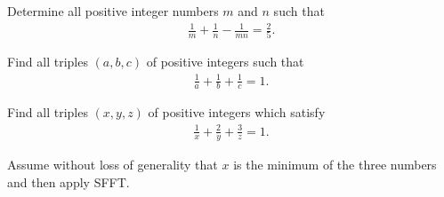 \documentclass{subfile}
\begin{document}

	\begin{problem} %
		Determine all positive integer numbers $m$ and $n$ such that
			\begin{align*}
				\frac{1}{m}+\frac{1}{n}-\frac{1}{mn}=\frac{2}{5}.
			\end{align*}
	\end{problem}

	\begin{problem} %
		Find all triples $(a,b,c)$ of positive integers such that
			\begin{align*}
				\frac{1}{a}+\frac{1}{b}+\frac{1}{c}=1.
			\end{align*}
	\end{problem}

	\begin{problem} %
		Find all triples $(x,y,z)$ of positive integers which satisfy
			\begin{align*}
				\frac{1}{x}+\frac{2}{y}+\frac{3}{z}=1.
			\end{align*}
	\end{problem}

	\begin{hint}
		Assume without loss of generality that $x$ is the minimum of the three numbers and then apply SFFT.
	\end{hint}
\end{document}
